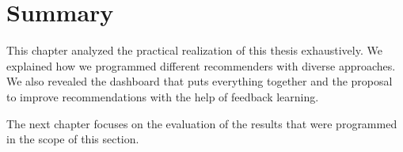 \section{Summary}

This chapter analyzed the practical realization of this thesis exhaustively. We explained how we programmed different recommenders with diverse approaches. We also revealed the dashboard that puts everything together and the proposal to improve recommendations with the help of feedback learning. 

The next chapter focuses on the evaluation of the results that were programmed in the scope of this section.


